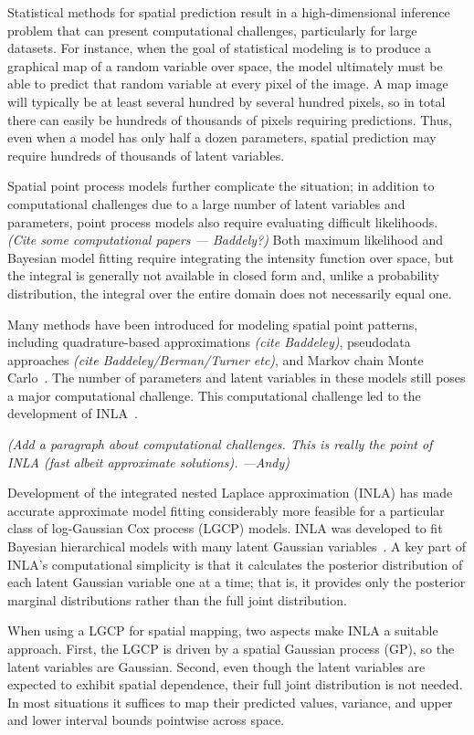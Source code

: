 \documentclass[]{interact}
\begin{document}
Statistical methods for spatial prediction result in a high-dimensional
inference problem that can present computational challenges, particularly for
large datasets. For instance, when the goal of statistical modeling is to
produce a graphical map of a random variable over space, the model ultimately
must be able to predict that random variable at every pixel of the image. A map
image will typically be at least several hundred by several hundred pixels, so
in total there can easily be hundreds of thousands of pixels requiring
predictions. Thus, even when a model has only half a dozen parameters, spatial
prediction may require hundreds of thousands of latent variables.

Spatial point process models further complicate the situation; in addition to
computational challenges due to a large number of latent variables and
parameters, point process models also require evaluating difficult likelihoods.
{\it (Cite some computational papers --- Baddely?)} Both maximum
likelihood and Bayesian model fitting require integrating the intensity
function over space, but the integral is generally not available in closed
form and, unlike a probability distribution, the integral over the entire
domain does not necessarily equal one.

Many methods have been introduced for modeling spatial point patterns,
including quadrature-based approximations {\it (cite Baddeley)}, pseudodata
approaches {\it (cite Baddeley/Berman/Turner etc)}, and Markov chain Monte
Carlo~\cite{moellerwaagepetersen}. The number of parameters and latent
variables in these models still poses a major computational challenge. This
computational challenge led to the development of INLA~\cite{rueetal}.

{\it (Add a paragraph about computational challenges. This is really the point
of INLA (fast albeit approximate solutions). ---Andy)}

Development of the integrated nested Laplace approximation (INLA) has made
accurate approximate model fitting considerably more feasible for a particular
class of log-Gaussian Cox process (LGCP) models. INLA was developed to fit
Bayesian hierarchical models with many latent Gaussian
variables~\cite{rueetal}. A key part of INLA's computational simplicity is that
it calculates the posterior distribution of each latent Gaussian variable one
at a time; that is, it provides only the posterior marginal distributions
rather than the full joint distribution.

When using a LGCP for spatial mapping, two aspects make INLA a suitable
approach. First, the LGCP is driven by a spatial Gaussian process (GP), so the
latent variables are Gaussian. Second, even though the latent variables are
expected to exhibit spatial dependence, their full joint distribution is not
needed. In most situations it suffices to map their predicted values, variance,
and upper and lower interval bounds pointwise across space.
\end{document}
